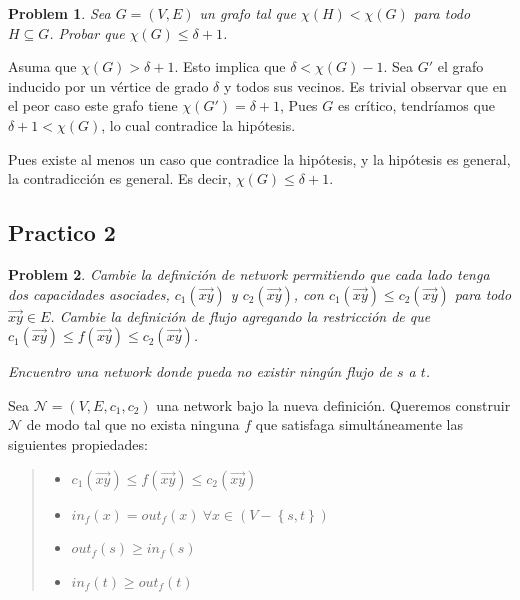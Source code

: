 \documentclass[a4paper]{article}
\newtheorem{problem}{Problem}
\newtheorem{problem}{Problem}
\begin{document}
\begin{problem}
    Sea $G = (V, E) $ un grafo tal que $\chi(H) < \chi(G)$ para todo $H
    \subseteq G$. Probar que $\chi(G) \leq \delta + 1$.
\end{problem}

Asuma que $\chi(G) > \delta + 1$. Esto implica que $\delta < \chi(G) - 1$. Sea
$G'$ el grafo inducido por un vértice de grado $\delta$ y todos sus vecinos. Es
trivial observar que en el peor caso este grafo tiene $\chi(G') = \delta + 1$,
Pues $G$ es crítico, tendríamos que $\delta + 1 < \chi(G)$, lo cual contradice
la hipótesis.

Pues existe al menos un caso que contradice la hipótesis, y la hipótesis es
general, la contradicción es general. Es decir, $\chi(G) \leq \delta + 1$.

\pagebreak
\subsection{Practico 2}

\begin{problem}
    Cambie la definición de network permitiendo que cada lado tenga dos
    capacidades asociades, $c_1(\overrightarrow{xy})$ y
    $c_2(\overrightarrow{xy})$, con $c_1(\overrightarrow{xy}) \leq
    c_2(\overrightarrow{xy})$ para todo $\overrightarrow{xy} \in E$. Cambie la
    definición de flujo agregando la restricción de que
    $c_{1}(\overrightarrow{xy}) \leq f(\overrightarrow{xy}) \leq
    c_2(\overrightarrow{xy})$.

    Encuentro una network donde pueda no existir ningún flujo de $s$ a $t$.
\end{problem}

Sea $\mathcal{N} = (V, E, c_1, c_2)$ una network bajo la nueva definición.
Queremos construir $\mathcal{N}$ de modo tal que no exista ninguna $f$ que
satisfaga simultáneamente las siguientes propiedades: 

\begin{quote}
    \begin{itemize}
        \item $c_1(\overrightarrow{xy}) \leq f(\overrightarrow{xy}) \leq c_2(\overrightarrow{xy})$
        \item $in_f(x) = out_f(x) ~ \forall x \in \left( V - \left\{ s, t \right\}  \right) $
        \item $out_f(s) \geq in_f(s) $
        \item $in_f(t) \geq out_f(t) $
    \end{itemize}
\end{quote}
\end{document}
